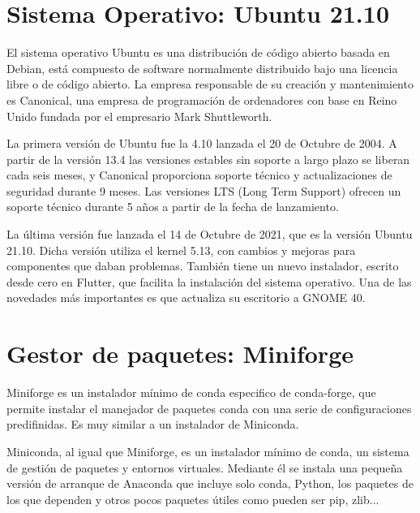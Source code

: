 \documentclass[a4paper, 12pt]{book}
\begin{document}
\section{Sistema Operativo: Ubuntu 21.10} 
\label{sec:sistema_operativo}

El sistema operativo Ubuntu es una distribución de código abierto basada en Debian, está compuesto de software normalmente distribuido bajo una licencia libre o de código abierto. La empresa responsable de su creación y mantenimiento es Canonical, una empresa de programación de ordenadores con base en Reino Unido fundada por el empresario Mark Shuttleworth.

La primera versión de Ubuntu fue la 4.10 lanzada el 20 de Octubre de 2004. A partir de la versión 13.4 las versiones estables sin soporte a largo plazo se liberan cada seis meses, y Canonical proporciona soporte técnico y actualizaciones de seguridad durante 9 meses. Las versiones LTS (Long Term Support) ofrecen un soporte técnico durante 5 años a partir de la fecha de lanzamiento.

La última versión fue lanzada el 14 de Octubre de 2021, que es la versión Ubuntu 21.10. Dicha versión utiliza el kernel 5.13, con cambios y mejoras para componentes que daban problemas. También tiene un nuevo instalador, escrito desde cero en Flutter, que facilita la instalación del sistema operativo. Una de las novedades más importantes es que actualiza su escritorio a GNOME 40.


\section{Gestor de paquetes: Miniforge}
\label{sec:gestor_de_paquetes}


Miniforge es un instalador mínimo de conda especifico de conda-forge, que permite instalar el manejador de paquetes conda con una serie de configuraciones predifinidas. Es muy similar a un instalador de Miniconda.

Miniconda, al igual que Miniforge, es un instalador mínimo de conda, un sistema de gestión de paquetes y entornos virtuales. Mediante él se instala una pequeña versión de arranque de Anaconda que incluye solo conda, Python, los paquetes de los que dependen y otros pocos paquetes útiles como pueden ser pip, zlib...
\end{document}
